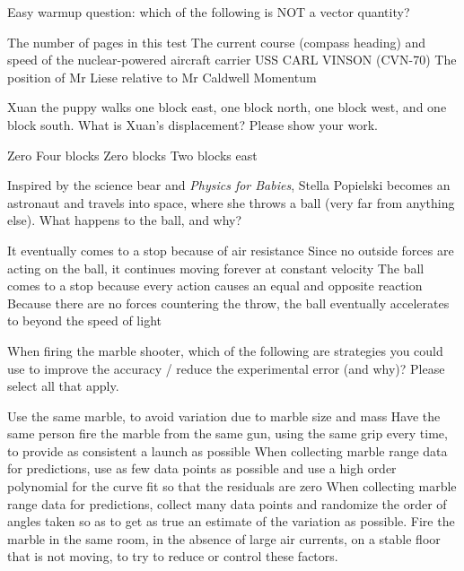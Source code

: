 \documentclass[exam,addpoints, noanswers]{exam}
\begin{document}
\begin{questions}
\question[5] Easy warmup question: which of the following is NOT a vector quantity?
\begin{choices}
\CorrectChoice The number of pages in this test
\choice The current course (compass heading) and speed of the nuclear-powered aircraft carrier USS CARL VINSON (CVN-70)
\choice The position of Mr Liese relative to Mr Caldwell
\choice Momentum
\end{choices}



\question[5] Xuan the puppy walks one block east, one block north, one block west, and one block south. What is Xuan's displacement? Please show your work.
\begin{choices}
\choice Zero
\choice Four blocks
\CorrectChoice Zero blocks
\choice Two blocks east
\end{choices}



\question[5] Inspired by the science bear and \emph{Physics for Babies}, Stella Popielski becomes an astronaut and travels into space, where she throws a ball (very far from anything else). What happens to the ball, and why?
\begin{choices}
\choice It eventually comes to a stop because of air resistance
\CorrectChoice Since no outside forces are acting on the ball, it continues moving forever at constant velocity
\choice The ball comes to a stop because every action causes an equal and opposite reaction
\choice Because there are no forces countering the throw, the ball eventually accelerates to beyond the speed of light
\end{choices}



\question[5]When firing the marble shooter, which of the following are strategies you could use to improve the accuracy / reduce the experimental error (and why)? Please select all that apply. 
\begin{choices}
\CorrectChoice Use the same marble, to avoid variation due to marble size and mass
\CorrectChoice Have the same person fire the marble from the same gun, using the same grip every time, to provide as consistent a launch as possible
\choice When collecting marble range data for predictions, use as few data points as possible and use a high order polynomial for the curve fit so that the residuals are zero
\CorrectChoice When collecting marble range data for predictions, collect many data points and randomize the order of angles taken so as to get as true an estimate of the variation as possible. 
\CorrectChoice Fire the marble in the same room, in the absence of large air currents, on a stable floor that is not moving, to try to reduce or control these factors. 
\end{choices}




\end{questions}
\end{document}
